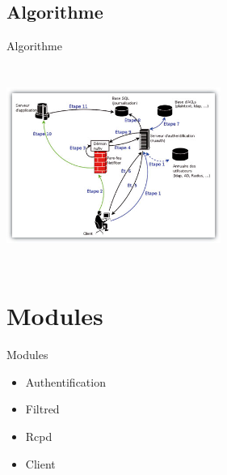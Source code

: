 \documentclass[t,12pt]{beamer}
\begin{document}
  \subsection{Algorithme}
    \begin{frame}{Algorithme}
	    \begin{center}\includegraphics[width=7cm,height=6.5cm]{images/algo.jpg}\end{center}
    \end{frame}                                                      


\section{Modules}                                                   
\begin{frame}{Modules}
    \begin{itemize}                                                 
	\item Authentification
	\newline
	\item Filtred
	\newline
	\item Rcpd
	\newline
	\item Client
\end{itemize}
\end{frame}                                                         
\end{document}
